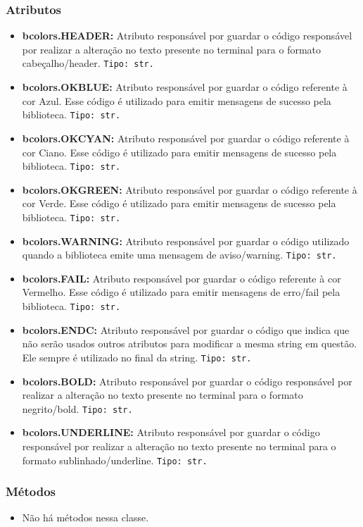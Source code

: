 \documentclass[10pt]{article}
\begin{document}
\begin{itemize}
        \subsubsection{\large Atributos}
            \begin{itemize}
            \item \textbf{bcolors.HEADER:} Atributo responsável por guardar o código responsável por realizar a alteração no texto presente no terminal para o formato cabeçalho/header. \texttt{Tipo: str.} 
            \item \textbf{bcolors.OKBLUE:} Atributo responsável por guardar o código referente à cor Azul. Esse código é utilizado para emitir mensagens de sucesso pela biblioteca. \texttt{Tipo: str.}
            \item \textbf{bcolors.OKCYAN:} Atributo responsável por guardar o código referente à cor Ciano. Esse código é utilizado para emitir mensagens de sucesso pela biblioteca. \texttt{Tipo: str.}
            \item \textbf{bcolors.OKGREEN:} Atributo responsável por guardar o código referente à cor Verde. Esse código é utilizado para emitir mensagens de sucesso pela biblioteca. \texttt{Tipo: str.}
            \item \textbf{bcolors.WARNING:} Atributo responsável por guardar o código utilizado quando a biblioteca emite uma mensagem de aviso/warning. \texttt{Tipo: str.}
            \item \textbf{bcolors.FAIL:} Atributo responsável por guardar o código referente à cor Vermelho. Esse código é utilizado para emitir mensagens de erro/fail pela biblioteca. \texttt{Tipo: str.}
            \item \textbf{bcolors.ENDC:} Atributo responsável por guardar o código que indica que não serão usados outros atributos para modificar a mesma string em questão. Ele sempre é utilizado no final da string. \texttt{Tipo: str.}
            \item \textbf{bcolors.BOLD:} Atributo responsável por guardar o código responsável por realizar a alteração no texto presente no terminal para o formato negrito/bold. \texttt{Tipo: str.} 
            \item \textbf{bcolors.UNDERLINE:} Atributo responsável por guardar o código responsável por realizar a alteração no texto presente no terminal para o formato sublinhado/underline. \texttt{Tipo: str.} 
            \end{itemize}
        \subsubsection{\large Métodos}
            \begin{itemize}
            \item Não há métodos nessa classe.
            \end{itemize}
        

\end{itemize}
\end{document}

